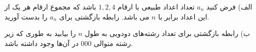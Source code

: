 \EXERCISE
الف) فرض کنید 
$a_n$
تعداد اعداد طبیعی با ارقام
$1, 2, 4$
باشد که مجموع ارقام هر یک از این اعداد برابر با
$n$
می باشد. رابطه بازگشتی برای
$a_n$
را بدست آورید.

ب) رابطه بازگشتی برای تعداد رشته‌های دودویی به طول
$n$
را بیابید به طوری که زیر رشته متوالی
$000$
در آن‌ها وجود داشته باشد.